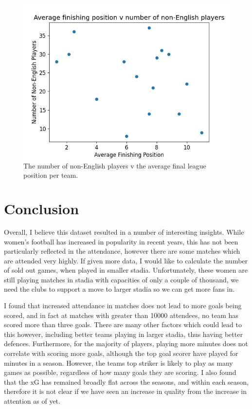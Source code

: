 \documentclass[12pt, a4paper, twocolumn]{article}
\begin{document}
\begin{figure}
  \includegraphics[width=\linewidth]{../vis/playerStats/nation_rank.png}
  \caption{The number of non-English players v the average final league position per team.}
  \label{nation_rank}
\end{figure}

\section{Conclusion}

Overall, I believe this dataset resulted in a number of interesting insights. While women's football has increased in popularity in recent years, this has not been particularly reflected in the attendance, however there are some matches which are attended very highly. If given more data, I would like to calculate the number of sold out games, when played in smaller stadia. Unfortunately, these women are still playing matches in stadia with capacities of only a couple of thousand, we need the clubs to support a move to larger stadia so we can get more fans in.

I found that increased attendance in matches does not lead to more goals being scored, and in fact at matches with greater than 10000 attendees, no team has scored more than three goals. There are many other factors which could lead to this however, including better teams playing in larger stadia, thus having better defences. Furthermore, for the majority of players, playing more minutes does not correlate with scoring more goals, although the top goal scorer have played for minutes in a season. However, the teams top striker is likely to play as many games as possible, regardless of how many goals they are scoring. I also found that the xG has remained broadly flat across the seasons, and within each season, therefore it is not clear if we have seen an increase in quality from the increase in attention as of yet.
\end{document}
